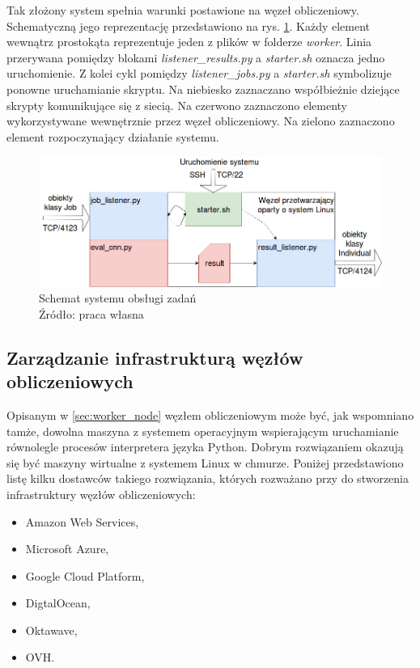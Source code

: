 Tak złożony system spełnia warunki postawione na węzeł obliczeniowy.
Schematyczną jego reprezentację przedstawiono na rys. \ref{fig:worker_node}.
Każdy element wewnątrz prostokąta reprezentuje jeden z plików w folderze \textit{worker}.
Linia przerywana pomiędzy blokami \textit{listener\_results.py} a \textit{starter.sh} oznacza jedno uruchomienie.
Z kolei cykl pomiędzy \textit{listener\_jobs.py} a \textit{starter.sh} symbolizuje ponowne uruchamianie skryptu.
Na niebiesko zaznaczano współbieżnie dziejące skrypty komunikujące się z siecią.
Na czerwono zaznaczono elementy wykorzystywane wewnętrznie przez węzeł obliczeniowy.
Na zielono zaznaczono element rozpoczynający działanie systemu.
\begin{figure}[h!tb]
	 \centering
	 \includegraphics[width = 1.0\linewidth]{img/worker_node}
	 \caption{Schemat systemu obsługi zadań \\
              Źródło: praca własna}
	 \label{fig:worker_node}
\end{figure}

\subsection{Zarządzanie infrastrukturą węzłów obliczeniowych}\label{sec:azure}
Opisanym w \ref{sec:worker_node} węzłem obliczeniowym może być, jak wspomniano tamże, dowolna maszyna z systemem operacyjnym wspierającym uruchamianie równolegle procesów interpretera języka Python.
Dobrym rozwiązaniem okazują się być maszyny wirtualne z systemem Linux w chmurze.
Poniżej przedstawiono listę kilku dostawców takiego rozwiązania, których rozważano przy do stworzenia infrastruktury węzłów obliczeniowych:

\begin{itemize}
  \item Amazon Web Services,
  \item Microsoft Azure,
  \item Google Cloud Platform,
  \item DigtalOcean,
  \item Oktawave,
  \item OVH.
\end{itemize}

